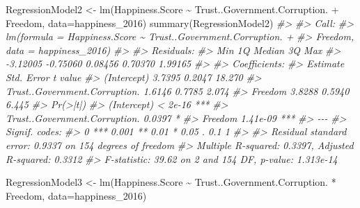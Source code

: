 \documentclass[
]{book}
\newenvironment{Shaded}{\begin{snugshade}}{\end{snugshade}}
\newcommand{\AttributeTok}[1]{\textcolor[rgb]{0.77,0.63,0.00}{#1}}
\newcommand{\CommentTok}[1]{\textcolor[rgb]{0.56,0.35,0.01}{\textit{#1}}}
\newcommand{\FunctionTok}[1]{\textcolor[rgb]{0.00,0.00,0.00}{#1}}
\newcommand{\NormalTok}[1]{#1}
\newcommand{\OtherTok}[1]{\textcolor[rgb]{0.56,0.35,0.01}{#1}}
\newcommand{\SpecialCharTok}[1]{\textcolor[rgb]{0.00,0.00,0.00}{#1}}
\theoremstyle{definition}
\theoremstyle{definition}
\theoremstyle{definition}
\theoremstyle{definition}
\theoremstyle{remark}
\begin{document}
\begin{Shaded}
\begin{Highlighting}[]
\NormalTok{RegressionModel2 }\OtherTok{\textless{}{-}} \FunctionTok{lm}\NormalTok{(Happiness.Score }\SpecialCharTok{\textasciitilde{}}\NormalTok{ Trust..Government.Corruption. }\SpecialCharTok{+}\NormalTok{ Freedom,}
                      \AttributeTok{data=}\NormalTok{happiness\_2016) }
\FunctionTok{summary}\NormalTok{(RegressionModel2) }
\CommentTok{\#\textgreater{} }
\CommentTok{\#\textgreater{} Call:}
\CommentTok{\#\textgreater{} lm(formula = Happiness.Score \textasciitilde{} Trust..Government.Corruption. + }
\CommentTok{\#\textgreater{}     Freedom, data = happiness\_2016)}
\CommentTok{\#\textgreater{} }
\CommentTok{\#\textgreater{} Residuals:}
\CommentTok{\#\textgreater{}      Min       1Q   Median       3Q      Max }
\CommentTok{\#\textgreater{} {-}3.12005 {-}0.75060  0.08456  0.70370  1.99165 }
\CommentTok{\#\textgreater{} }
\CommentTok{\#\textgreater{} Coefficients:}
\CommentTok{\#\textgreater{}                               Estimate Std. Error t value}
\CommentTok{\#\textgreater{} (Intercept)                     3.7395     0.2047  18.270}
\CommentTok{\#\textgreater{} Trust..Government.Corruption.   1.6146     0.7785   2.074}
\CommentTok{\#\textgreater{} Freedom                         3.8288     0.5940   6.445}
\CommentTok{\#\textgreater{}                               Pr(\textgreater{}|t|)    }
\CommentTok{\#\textgreater{} (Intercept)                    \textless{} 2e{-}16 ***}
\CommentTok{\#\textgreater{} Trust..Government.Corruption.   0.0397 *  }
\CommentTok{\#\textgreater{} Freedom                       1.41e{-}09 ***}
\CommentTok{\#\textgreater{} {-}{-}{-}}
\CommentTok{\#\textgreater{} Signif. codes:  }
\CommentTok{\#\textgreater{} 0 \textquotesingle{}***\textquotesingle{} 0.001 \textquotesingle{}**\textquotesingle{} 0.01 \textquotesingle{}*\textquotesingle{} 0.05 \textquotesingle{}.\textquotesingle{} 0.1 \textquotesingle{} \textquotesingle{} 1}
\CommentTok{\#\textgreater{} }
\CommentTok{\#\textgreater{} Residual standard error: 0.9337 on 154 degrees of freedom}
\CommentTok{\#\textgreater{} Multiple R{-}squared:  0.3397, Adjusted R{-}squared:  0.3312 }
\CommentTok{\#\textgreater{} F{-}statistic: 39.62 on 2 and 154 DF,  p{-}value: 1.313e{-}14}


\NormalTok{RegressionModel3 }\OtherTok{\textless{}{-}} \FunctionTok{lm}\NormalTok{(Happiness.Score }\SpecialCharTok{\textasciitilde{}}\NormalTok{ Trust..Government.Corruption. }\SpecialCharTok{*}\NormalTok{ Freedom, }
                       \AttributeTok{data=}\NormalTok{happiness\_2016) }


\end{Highlighting}
\end{Shaded}
\end{document}
